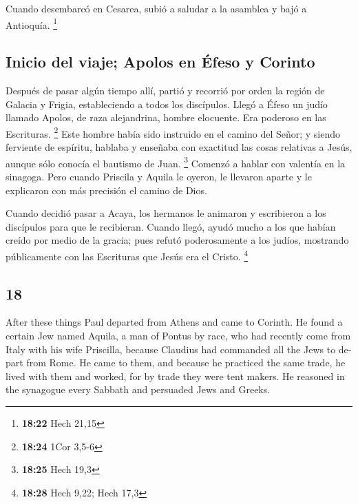 \begin{paracol}{2}
 Cuando desembarcó en Cesarea, subió a saludar a la
asamblea y bajó a Antioquía. \footnote{\textbf{18:22} Hech 21,15}

\hypertarget{inicio-del-viaje-apolos-en-uxe9feso-y-corinto}{%
\subsection{Inicio del viaje; Apolos en Éfeso y
Corinto}\label{inicio-del-viaje-apolos-en-uxe9feso-y-corinto}}

 Después de pasar algún tiempo allí, partió y recorrió
por orden la región de Galacia y Frigia, estableciendo a todos los
discípulos.  Llegó a Éfeso un judío llamado Apolos, de
raza alejandrina, hombre elocuente. Era poderoso en las Escrituras.
\footnote{\textbf{18:24} 1Cor 3,5-6}  Este hombre había
sido instruido en el camino del Señor; y siendo ferviente de espíritu,
hablaba y enseñaba con exactitud las cosas relativas a Jesús, aunque
sólo conocía el bautismo de Juan. \footnote{\textbf{18:25} Hech 19,3}
 Comenzó a hablar con valentía en la sinagoga. Pero
cuando Priscila y Aquila le oyeron, le llevaron aparte y le explicaron
con más precisión el camino de Dios.

 Cuando decidió pasar a Acaya, los hermanos le animaron y
escribieron a los discípulos para que le recibieran. Cuando llegó, ayudó
mucho a los que habían creído por medio de la gracia; 
pues refutó poderosamente a los judíos, mostrando públicamente con las
Escrituras que Jesús era el Cristo. \footnote{\textbf{18:28} Hech 9,22;
  Hech 17,3}

\switchcolumn
\begin{otherlanguage}{english}

\hypertarget{section-35}{%
\section{18}\label{section-35}}

 After these things Paul departed from Athens and came to
Corinth.  He found a certain Jew named Aquila, a man of
Pontus by race, who had recently come from Italy with his wife
Priscilla, because Claudius had commanded all the Jews to depart from
Rome. He came to them,  and because he practiced the same
trade, he lived with them and worked, for by trade they were tent
makers.  He reasoned in the synagogue every Sabbath and
persuaded Jews and Greeks.


\end{otherlanguage}
\end{paracol}
